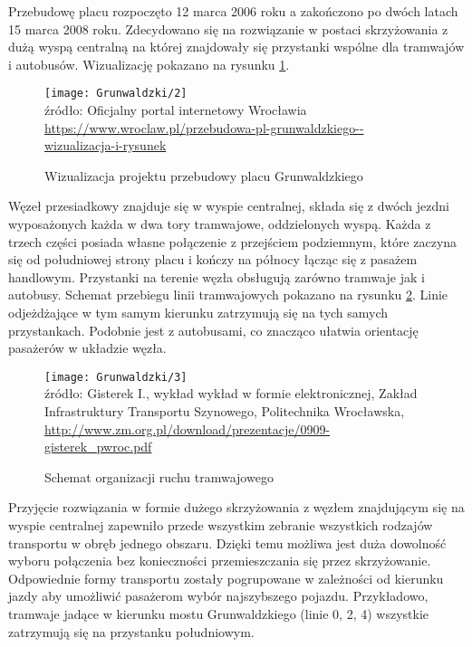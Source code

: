 \documentclass[twoside,12pt]{article}
\begin{document}
	Przebudowę placu rozpoczęto 12 marca 2006 roku a zakończono po dwóch latach 15 marca 2008 roku. Zdecydowano się na rozwiązanie w postaci skrzyżowania z dużą wyspą centralną na której znajdowały się przystanki wspólne dla tramwajów i autobusów. Wizualizację pokazano na rysunku \ref{grunwaldzki2}. 
	
	\begin{figure}[H]
		\centering
		\caption{Wizualizacja projektu przebudowy placu Grunwaldzkiego}
		\texttt{[image: Grunwaldzki/2]}\\
		\footnotesize{źródło: Oficjalny portal internetowy Wrocławia %
		\url{https://www.wroclaw.pl/przebudowa-pl-grunwaldzkiego--wizualizacja-i-rysunek}}
		\label{grunwaldzki2}
	\end{figure}	
	
	Węzeł przesiadkowy znajduje się w wyspie centralnej, składa się z dwóch jezdni wyposażonych każda w dwa tory tramwajowe, oddzielonych wyspą. Każda z trzech części posiada własne połączenie z przejściem podziemnym, które zaczyna się od południowej strony placu i kończy na północy łącząc się z pasażem handlowym. Przystanki na terenie węzła obsługują zarówno tramwaje jak i autobusy. Schemat przebiegu linii tramwajowych pokazano na rysunku \ref{grunwaldzki3}. Linie odjeżdżające w tym samym kierunku zatrzymują się na tych samych przystankach. Podobnie jest z autobusami, co znacząco ułatwia orientację pasażerów w układzie węzła. 
	
	\begin{figure}[H]
		\centering
		\caption{Schemat organizacji ruchu tramwajowego}
		\texttt{[image: Grunwaldzki/3]}\\
		\footnotesize{źródło: Gisterek I., wykład wykład w formie elektronicznej, Zakład Infrastruktury Transportu Szynowego, Politechnika Wrocławska, \url{http://www.zm.org.pl/download/prezentacje/0909-gisterek_pwroc.pdf} \cite{grunwaldzki2}}
		\label{grunwaldzki3}
	\end{figure}	
	
	Przyjęcie rozwiązania w formie dużego skrzyżowania z węzłem znajdującym się na wyspie centralnej zapewniło przede wszystkim zebranie wszystkich rodzajów transportu w obręb jednego obszaru. Dzięki temu możliwa jest duża dowolność wyboru połączenia bez konieczności przemieszczania się przez skrzyżowanie. Odpowiednie formy transportu zostały pogrupowane w zależności od kierunku jazdy aby umożliwić pasażerom wybór najszybszego pojazdu. Przykładowo, tramwaje jadące w kierunku mostu Grunwaldzkiego (linie 0, 2, 4) wszystkie zatrzymują się na przystanku południowym. 
	
\end{document}
